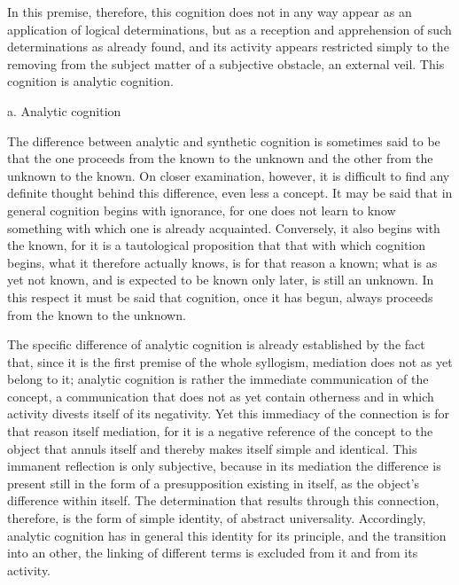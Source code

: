 In this premise, therefore,
this cognition does not in any way appear as
an application of logical determinations,
but as a reception and apprehension
of such determinations as already found,
and its activity appears restricted
simply to the removing from
the subject matter of a subjective obstacle,
an external veil.
This cognition is analytic cognition.

a. Analytic cognition

The difference between analytic and synthetic cognition is
sometimes said to be that the one proceeds
from the known to the unknown
and the other from the unknown to the known.
On closer examination, however, it is difficult to
find any definite thought behind this difference,
even less a concept.
It may be said that in general
cognition begins with ignorance,
for one does not learn to know something
with which one is already acquainted.
Conversely, it also begins with the known,
for it is a tautological proposition that
that with which cognition begins,
what it therefore actually knows,
is for that reason a known;
what is as yet not known,
and is expected to be known only later,
is still an unknown.
In this respect it must be said that cognition,
once it has begun, always proceeds
from the known to the unknown.

The specific difference of analytic cognition is
already established by the fact that,
since it is the first premise of the whole syllogism,
mediation does not as yet belong to it;
analytic cognition is rather
the immediate communication of the concept,
a communication that does not as yet contain otherness
and in which activity divests itself of its negativity.
Yet this immediacy of the connection is
for that reason itself mediation,
for it is a negative reference of the concept to
the object that annuls itself
and thereby makes itself simple and identical.
This immanent reflection is only subjective,
because in its mediation the difference is
present still in the form of a presupposition
existing in itself,
as the object's difference within itself.
The determination that results
through this connection, therefore,
is the form of simple identity,
of abstract universality.
Accordingly, analytic cognition has in general
this identity for its principle,
and the transition into an other,
the linking of different terms is
excluded from it and from its activity.

